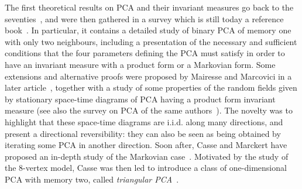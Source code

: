 \documentclass[AHL,Unicode,longabstracts]{cedram}
\newcounter{a}
\begin{document}
The first theoretical results on PCA and their invariant measures go back to the seventies~\cite{belyaev,kozlov,vasilyev}, and were then gathered in a survey which is still today a reference book~\cite{dobrushin}. In particular, it contains a detailed study of binary PCA of memory one with only two neighbours, including a presentation of the necessary and sufficient conditions that the four parameters defining the PCA must satisfy in order to have an invariant measure with a product form or a Markovian form. Some extensions and alternative proofs were proposed by Mairesse and Marcovici in a later article~\cite{mm_ihp}, together with a study of some properties of the random fields given by stationary space-time diagrams of PCA having a product form invariant measure (see also the survey on PCA of the same authors~\cite{mm_tcs}). The novelty was to highlight that these space-time diagrams are i.i.d. along many directions, and present a directional reversibility: they can also be seen as being obtained by iterating some PCA in another direction. Soon after, Casse and Marckert have proposed an in-depth study of the Markovian case~\cite{Casse16,CM15}. Motivated by the study of the $8$-vertex model, Casse was then led to introduce a class of one-dimensional PCA with memory two, called \emph{triangular PCA}~\cite{Casse17}.
\end{document}
